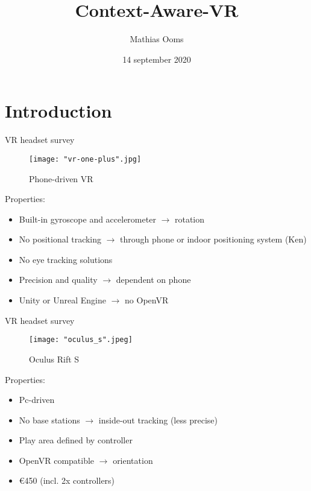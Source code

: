 \documentclass{beamer}
\title[Your Short Title]{Context-Aware-VR}
\author{Mathias Ooms}
\institute{University of Antwerp}
\date{14 september 2020}
\begin{document}
\begin{frame}
  \titlepage
\end{frame}


\section{Introduction}


\begin{frame}{VR headset survey}
	\begin{figure}
		\texttt{[image: "vr-one-plus".jpg]}
		\caption{Phone-driven VR}
	\end{figure}
	
	Properties:
	\begin{itemize}
		\item Built-in gyroscope and accelerometer $\rightarrow$ rotation
		\item No positional tracking $\rightarrow$ through phone or indoor positioning system (Ken)
		\item No eye tracking solutions
		\item Precision and quality $\rightarrow$ dependent on phone
		\item Unity or Unreal Engine $\rightarrow$ no OpenVR
	\end{itemize}
\end{frame}


\begin{frame}{VR headset survey}
	\begin{figure}
		\texttt{[image: "oculus\_s".jpeg]}
		\caption{Oculus Rift S}
	\end{figure}
	
	Properties:
	\begin{itemize}
		\item Pc-driven
	    \item No base stations $\rightarrow$ inside-out tracking (less precise)
	    \item Play area defined by controller
      	\item OpenVR compatible $\rightarrow$ orientation
		\item €450 (incl. 2x controllers)
	\end{itemize}
\end{frame}
\end{document}
